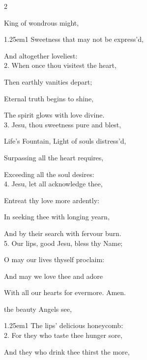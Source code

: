 \begin{paracol}{2}

\mattinsInvitatoryHymn\label{HolyNameInvitatoryHymn}

 King of wondrous might,

\begin{hangparas}{1.25em}{1}
Sweetness that may not be express'd,

And altogether loveliest:\\

2. When once thou visitest the heart,

Then earthly vanities depart;

Eternal truth begins to shine,

The spirit glows with love divine.\\

3. Jesu, thou sweetness pure and blest,

Life’s Fountain, Light of souls distress'd,

Surpassing all the heart requires,

Exceeding all the soul desires:\\

4. Jesu, let all acknowledge thee,

Entreat thy love more ardently:

In seeking thee with longing yearn,

And by their search with fervour burn.\\

5. Our lips, good Jesu, bless thy Name;

O may our lives thyself proclaim:

And may we love thee and adore

With all our hearts for evermore. Amen.
\end{hangparas}

\switchcolumn

\mattinsOfficeHymn\label{HolyNameMattinsHymn}
 the beauty Angels see,


\begin{hangparas}{1.25em}{1}
The lips' delicious honeycomb:\\

2. For they who taste thee hunger sore,

And they who drink thee thirst the more,


\end{hangparas}
\end{paracol}
